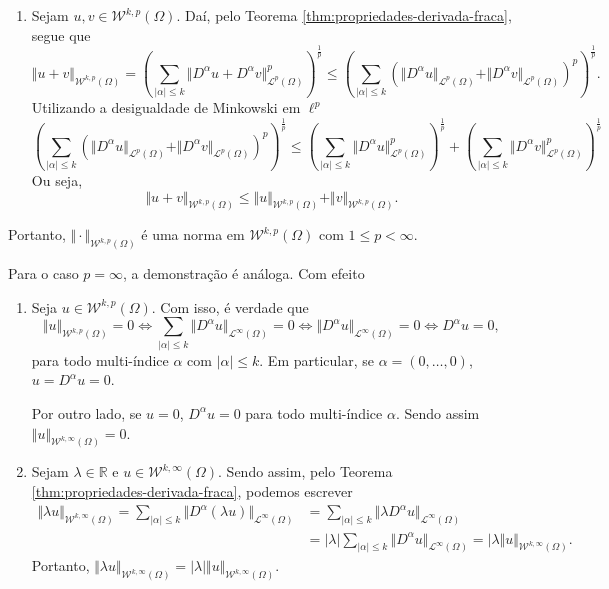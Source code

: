 \documentclass[a4paper, 11pt]{book}
\theoremstyle{definition}
\newcommand{\bR}{\mathbb{R}}
\newcommand{\cL}{\mathcal{L}}
\newcommand{\cW}{\mathcal{W}}
\begin{document}
\begin{prf}
\begin{enumerate}[leftmargin=*]
        \item Sejam $u, v \in \cW^{k,p}(\Omega)$. Daí, pelo Teorema \ref{thm:propriedades-derivada-fraca}, segue que
        \[
            \Vert u + v \Vert_{\cW^{k,p}(\Omega)} = \left(\sum_{|\alpha| \leqslant k} \Vert D^\alpha u + D^\alpha v \Vert_{\cL^p(\Omega)}^p\right)^{\!\!\frac{1}{p}} \leqslant \left(\sum_{|\alpha| \leqslant k} \left(\Vert D^\alpha u \Vert_{\cL^p(\Omega)} + \Vert D^\alpha v \Vert_{\cL^p(\Omega)}\right)^p \right)^{\!\!\frac{1}{p}}.
        \]
        Utilizando a desigualdade de Minkowski em $\ell^p$
        \[
            \left(\sum_{|\alpha| \leqslant k} \left(\Vert D^\alpha u \Vert_{\cL^p(\Omega)} + \Vert D^\alpha v \Vert_{\cL^p(\Omega)}\right)^p \right)^{\!\!\frac{1}{p}} \leqslant \left( \sum_{|\alpha| \leqslant k} \Vert D^\alpha u \Vert_{\cL^p(\Omega)}^p \right)^{\!\!\frac{1}{p}} + \left( \sum_{|\alpha| \leqslant k} \Vert D^\alpha v \Vert_{\cL^p(\Omega)}^p \right)^{\!\!\frac{1}{p}}
        \]
        Ou seja,
        \[
            \Vert u + v \Vert_{\cW^{k,p}(\Omega)} \leqslant \Vert u \Vert_{\cW^{k,p}(\Omega)} + \Vert v \Vert_{\cW^{k,p}(\Omega)}.
        \]
    \end{enumerate}
    Portanto, $\Vert \cdot \Vert_{\cW^{k,p}(\Omega)}$ é uma norma em $\cW^{k,p}(\Omega)$ com $1 \leqslant p < \infty$.

    Para o caso $p = \infty$, a demonstração é análoga.
    Com efeito
    \begin{enumerate}[leftmargin=*]
        \item Seja $u \in \cW^{k,p}(\Omega)$. Com isso, é verdade que
        \[
            \Vert u \Vert_{\cW^{k,p}(\Omega)} = 0 \iff \sum_{|\alpha| \leqslant k} \Vert D^\alpha u \Vert_{\cL^\infty(\Omega)} = 0 \iff \Vert D^\alpha u \Vert_{\cL^\infty(\Omega)} = 0 \iff D^\alpha u = 0,
        \]
        para todo multi-índice $\alpha$ com $|\alpha| \leqslant k$.
        Em particular, se $\alpha = (0,\dots,0)$, $u = D^\alpha u = 0$.

        Por outro lado, se $u = 0$, $D^\alpha u = 0$ para todo multi-índice $\alpha$. Sendo assim $\Vert u \Vert_{\cW^{k,\infty}(\Omega)} = 0$.

        \item Sejam $\lambda \in \bR$ e $u \in \cW^{k,\infty}(\Omega)$. Sendo assim, pelo Teorema \ref{thm:propriedades-derivada-fraca}, podemos escrever
        \[
            \begin{aligned}
                \Vert \lambda u \Vert_{\cW^{k,\infty}(\Omega)} = \sum_{|\alpha| \leqslant k} \Vert D^\alpha (\lambda u) \Vert_{\cL^\infty(\Omega)} &= \sum_{|\alpha| \leqslant k} \Vert \lambda D^\alpha u \Vert_{\cL^\infty(\Omega)}\\ 
                &= |\lambda|\sum_{|\alpha| \leqslant k} \Vert D^\alpha u \Vert_{\cL^\infty(\Omega)} = |\lambda\Vert u \Vert_{\cW^{k,\infty}(\Omega)}.
            \end{aligned}
        \]
        Portanto, $\Vert \lambda u \Vert_{\cW^{k,\infty}(\Omega)} = |\lambda|\Vert u \Vert_{\cW^{k,\infty}(\Omega)}$.


\end{enumerate}
\end{prf}
\end{document}
